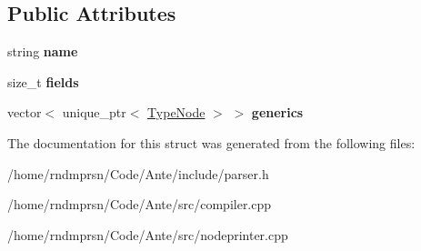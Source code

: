 \subsection*{Public Attributes}
\begin{DoxyCompactItemize}
\item 
\mbox{\label{structDataDeclNode_a618277caf46d37c55c298e06b98e175e}} 
string {\bfseries name}
\item 
\mbox{\label{structDataDeclNode_a795cd865b2b550366edf82e403dbeb80}} 
size\+\_\+t {\bfseries fields}
\item 
\mbox{\label{structDataDeclNode_a6203f7bda17d6a542e698be81ef9e3b3}} 
vector$<$ unique\+\_\+ptr$<$ \hyperlink{structTypeNode}{Type\+Node} $>$ $>$ {\bfseries generics}
\end{DoxyCompactItemize}


The documentation for this struct was generated from the following files\+:\begin{DoxyCompactItemize}
\item 
/home/rndmprsn/\+Code/\+Ante/include/parser.\+h\item 
/home/rndmprsn/\+Code/\+Ante/src/compiler.\+cpp\item 
/home/rndmprsn/\+Code/\+Ante/src/nodeprinter.\+cpp\end{DoxyCompactItemize}

